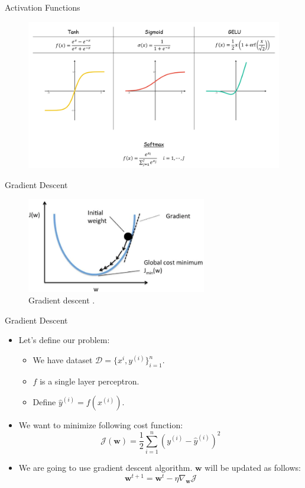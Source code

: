 \documentclass[compress,oilve,t]{beamer}
\begin{document}
\begin{frame}{Activation Functions}
	\begin{figure}[H]
		\centering
		\includegraphics[width=1\textwidth]{Figs/section_1/activation_functions_2.PNG}
	\end{figure}
\end{frame}

\begin{frame}{Gradient Descent}
	\begin{figure}[H]
		\centering
		\includegraphics[width=0.70\textwidth]{Figs/gradient_descent2.png}
		\caption{Gradient descent \cite{gradient-descend2}.}
	\end{figure}
\end{frame}

\begin{frame}{Gradient Descent}
	\begin{itemize}
		\item Let's define our problem:
		\begin{itemize}
			\item We have dataset $\mathcal{D} = \{x^{i}, y^{(i)}\}_{i=1}^{n}$.
			\medskip
			\item $f$ is a single layer perceptron.
			\medskip
			\item Define $\hat{y}^{(i)} = f(x^{(i)})$.
		\end{itemize}
		\medskip
		\item We want to minimize following cost function:
		$$
		\mathcal{J}(\bm{w})  = \frac{1}{2} \sum_{i=1}^{n} (y^{(i)} - \hat{y}^{(i)})^2
		$$
		\medskip
		\item We are going to use gradient descent algorithm. $\bm{w}$ will be updated as follows:
		\[
		\bm{w}^{t+1} = \bm{w}^{t} - \eta \nabla_{\bm{w}} \mathcal{J}
		\]
	\end{itemize}
\end{frame}
\end{document}
